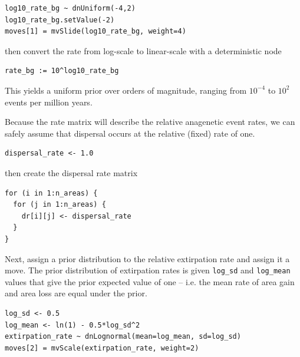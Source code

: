 \begin{snugshade}
\begin{lstlisting}
log10_rate_bg ~ dnUniform(-4,2)
log10_rate_bg.setValue(-2)
moves[1] = mvSlide(log10_rate_bg, weight=4)
\end{lstlisting}
\end{snugshade}

then convert the rate from log-scale to linear-scale with a deterministic node

\begin{snugshade}
\begin{lstlisting}
rate_bg := 10^log10_rate_bg
\end{lstlisting}
\end{snugshade}

This yields a uniform prior over orders of magnitude, ranging from $10^{-4}$ to $10^2$ events per million years.

Because the rate matrix will describe the relative anagenetic event rates, we can safely assume that dispersal occurs at the relative (fixed) rate of one.

\begin{snugshade}
\begin{lstlisting}
dispersal_rate <- 1.0
\end{lstlisting}
\end{snugshade}

then create the dispersal rate matrix

\begin{snugshade}
\begin{lstlisting}
for (i in 1:n_areas) {
  for (j in 1:n_areas) {
    dr[i][j] <- dispersal_rate
  }
}
\end{lstlisting}
\end{snugshade}

Next, assign a prior distribution to the relative extirpation rate and assign it a move.
The prior distribution of extirpation rates is given {\tt log\_sd} and {\tt log\_mean} values that give the prior expected value of one -- i.e. the mean rate of area gain and area loss are equal under the prior.

\begin{snugshade}
\begin{lstlisting}
log_sd <- 0.5
log_mean <- ln(1) - 0.5*log_sd^2
extirpation_rate ~ dnLognormal(mean=log_mean, sd=log_sd)
moves[2] = mvScale(extirpation_rate, weight=2)
\end{lstlisting}
\end{snugshade}

